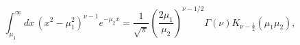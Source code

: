 \begin{equation}
\int _{\mu _{1}}^{\infty }dx\, \left(x^{2}-\mu _{1}^{2}\right)^{\nu -1}e^{-\mu _{2}x}=\frac{1}{\sqrt{\pi }}\left(\frac{2\mu _{1}}{\mu _{2}}\right)^{\nu -1/2}\Gamma \left(\nu \right)K_{\nu -\frac{1}{2}}\left(\mu _{1}\mu _{2}\right),\label{grad int}\end{equation}

